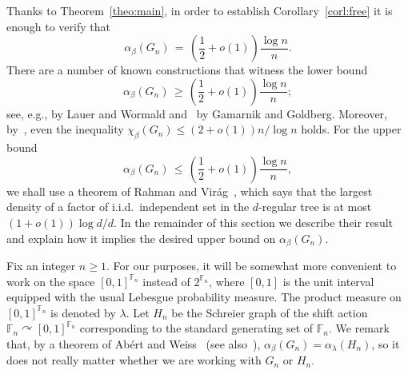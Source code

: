 \documentclass[10pt]{amsart}
\theoremstyle{definition}
\newcommand{\0}{\varnothing}
\renewcommand{\leq}{\leqslant}
\renewcommand{\geq}{\geqslant}
\newcommand{\F}{\mathbb{F}}
\begin{document}
Thanks to Theorem~\ref{theo:main}, in order to establish Corollary~\ref{corl:free} it is enough to verify that
\[
\alpha_\beta\left(G_n\right) \,=\, \left(\frac{1}{2} + o(1)\right) \frac{\log n}{n}.
\]
There are a number of known constructions that witness the lower bound
\[
\alpha_\beta\left(G_n\right) \,\geq\, \left(\frac{1}{2} + o(1)\right) \frac{\log n}{n};
\]
see, e.g., \cite{LW} by Lauer and Wormald and~\cite{GG} by Gamarnik and Goldberg. Moreover, by~\cite[Corollary~1.2]{Ber}, even the inequality $\chi_\beta(G_n) \leq (2+o(1))n/\log n$ holds. For the upper bound
\begin{equation}\label{eq:upper}
\alpha_\beta(G_n) \,\leq\, \left(\frac{1}{2} + o(1)\right)\frac{\log n}{n},
\end{equation}
we shall use a theorem of Rahman and Virág~\cite{RV}, which says that the largest density of a factor of i.i.d.~independent set in the $d$-regular tree is at most $(1+o(1))\log d/d$. In the remainder of this section we describe their result and explain how it implies the desired upper bound on $\alpha_\beta(G_n)$.

Fix an integer $n \geq 1$. For our purposes, it will be somewhat more convenient to work on the space $[0,1]^{\F_n}$ instead of $2^{\F_n}$, where $[0,1]$ is the unit interval equipped with the usual Lebesgue probability measure. The product measure on $[0,1]^{\F_n}$ is denoted by $\lambda$. Let $H_n$ be the Schreier graph of the shift action $\F_n \curvearrowright [0,1]^{\F_n}$ corresponding to the standard generating set of $\F_n$. We remark that, by a theorem of Abért and Weiss~\cite{AW} (see also~\cite[Theorem~6.46]{KechrisMarks}), $\alpha_\beta(G_n) = \alpha_\lambda(H_n)$, so it does not really matter whether we are working with $G_n$ or $H_n$.
\end{document}
